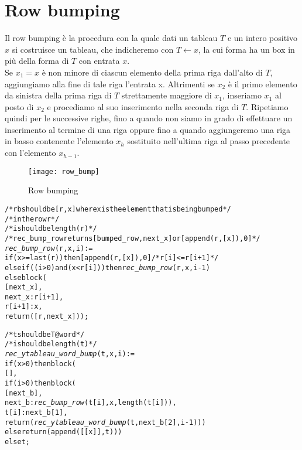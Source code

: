 \section{Row bumping}
Il row bumping \`e la procedura con la quale dati un tableau $T$ e un
intero positivo $x$ si costruisce un tableau, che indicheremo con $T
\gets x$, la cui forma ha un box in pi\`u della forma di $T$ con
entrata $x$.\\
Se $x_1 = x$ \`e non minore di ciascun elemento della prima riga
dall'alto di $T$, aggiungiamo alla fine di tale riga l'entrata x.
Altrimenti se $x_2$ \`e il primo elemento da sinistra della prima riga
di $T$ strettamente maggiore di $x_1$, inseriamo $x_1$ al posto di
$x_2$ e procediamo al suo inserimento nella seconda riga di $T$.
Ripetiamo quindi per le successive righe, fino a quando non siamo in
grado di effettuare un inserimento al termine di una riga oppure fino
a quando aggiungeremo una riga in basso contenente l'elemento $x_h$
sostituito nell'ultima riga al passo precedente con l'elemento
$x_{h-1}$.

\begin{figure}[h]
\centering
\texttt{[image: row\_bump]}
\caption{Row bumping}
\end{figure}

\begin{alltt}
/* rb should be [r, x] where x is the element that is being bumped */
/* in the row r */
/* i should be length (r) */
/* rec\_bump\_row returns [bumped\_row, next\_x] or [append (r,[x]), 0]  */
\emph{rec\_bump\_row} (r, x, i) :=
if (x >= last (r)) then [append (r, [x]), 0] /* r[i] <= r[i+1] */
else if ((i > 0) and (x < r[i])) then \emph{rec\_bump\_row} (r, x, i-1)
else block (
  [next_x],
  next_x : r[i+1],
  r[i+1] : x,
  return ([r, next_x]));

/* t should be T@word */
/* i should be length (t) */
\emph{rec\_ytableau\_word\_bump} (t, x, i) :=
if (x > 0) then block (
  [],
  if (i > 0) then block (
    [next\_b],
    next\_b : \emph{rec\_bump\_row} (t[i], x, length (t[i])),
    t[i] : next\_b[1],
    return (\emph{rec\_ytableau\_word\_bump} (t, next_b[2], i-1)))
  else return (append ([[x]], t)))
else t;
\end{alltt}

